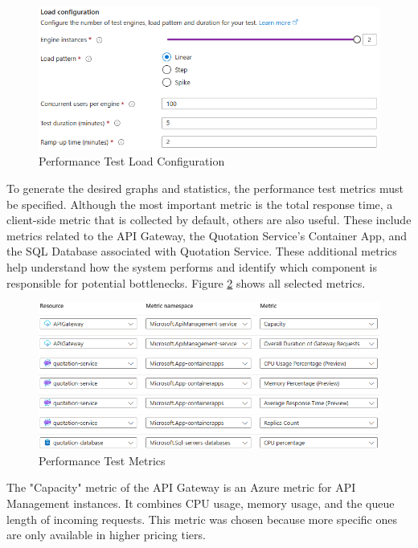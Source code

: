 \documentclass[12pt, reqno]{amsbook}
\theoremstyle{definition}
\theoremstyle{definition}
\numberwithin{section}{chapter}
\numberwithin{table}{chapter}
\numberwithin{figure}{chapter}
\begin{document}
\begin{figure}[H]
  \centering
  \includegraphics[width=0.9\linewidth]{images/LoadTestingLoadConfiguration.png}
  \caption{\label{Figure:LoadTestingLoadConfiguration}Performance Test Load Configuration}
\end{figure}

To generate the desired graphs and statistics, the performance test metrics must be specified. Although the most important metric is the total response time, a client-side metric that is collected by default, others are also useful. These include metrics related to the \ac{API} Gateway, the Quotation Service's Container App, and the SQL Database associated with Quotation Service. These additional metrics help understand how the system performs and identify which component is responsible for potential bottlenecks. Figure \ref{Figure:LoadTestingMetrics} shows all selected metrics.

\begin{figure}[H]
  \centering
  \includegraphics[width=1\linewidth]{images/LoadTestingMetrics.png}
  \caption{\label{Figure:LoadTestingMetrics}Performance Test Metrics}
\end{figure}

The "Capacity" metric of the API Gateway is an Azure metric for API Management instances. It combines \ac{CPU} usage, memory usage, and the queue length of incoming requests. This metric was chosen because more specific ones are only available in higher pricing tiers.
\end{document}
